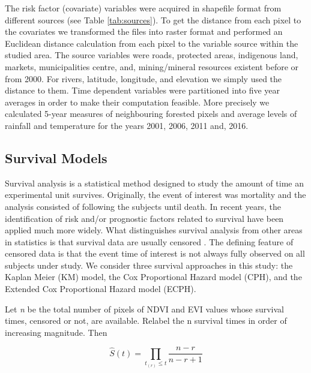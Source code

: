 
The risk factor (covariate) variables were acquired in shapefile format from different sources (see Table \ref{tab:sources}). To get the distance from each pixel to the covariates we transformed the files into raster format and performed an Euclidean distance calculation from each pixel to the variable source within the studied area. The source variables were roads, protected areas, indigenous land, markets, municipalities centre, and, mining/mineral resources existent before or from 2000. For rivers, latitude, longitude, and elevation we simply used the distance to them. Time dependent variables were partitioned into five year averages in order to make their computation feasible. More precisely we calculated 5-year measures of neighbouring forested pixels and average levels of rainfall and temperature for the years 2001, 2006, 2011 and, 2016. 

\subsection{Survival Models}  %

Survival analysis is a statistical method designed to study the amount of time an experimental unit survives. Originally, the event of interest was mortality and the analysis consisted of following the subjects until death. In recent years, the identification of risk and/or prognostic factors related to survival have been applied much more widely.  What distinguishes survival analysis from other areas in statistics is that survival data are usually censored \citep{lee_wang_2003,cao_2005}. The defining feature of censored data is that the event time of interest is not always fully observed on all subjects under study. We consider three survival approaches in this study: the Kaplan Meier (KM) model,  the Cox Proportional Hazard model (CPH), and the Extended Cox Proportional Hazard model (ECPH).


Let \textit{n} be the total number of pixels of NDVI and EVI values whose survival times, censored or not, are available. Relabel the n survival times in order of increasing magnitude. Then

\begin{center}
\begin{equation}
\hat{S}(t) = \prod_{t_{(r)} \leq t} \frac{n-r}{n-r + 1}\label{eq:3} 
\end{equation}
\end{center}

